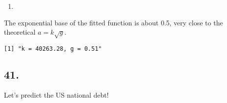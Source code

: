 \documentclass[]{article}
\newenvironment{Shaded}{\begin{snugshade}}{\end{snugshade}}
\newcommand{\DecValTok}[1]{\textcolor[rgb]{0.00,0.00,0.81}{#1}}
\newcommand{\FloatTok}[1]{\textcolor[rgb]{0.00,0.00,0.81}{#1}}
\newcommand{\KeywordTok}[1]{\textcolor[rgb]{0.13,0.29,0.53}{\textbf{#1}}}
\newcommand{\NormalTok}[1]{#1}
\newcommand{\OperatorTok}[1]{\textcolor[rgb]{0.81,0.36,0.00}{\textbf{#1}}}
\newcommand{\StringTok}[1]{\textcolor[rgb]{0.31,0.60,0.02}{#1}}
\begin{document}
\begin{Shaded}
\end{Shaded}

\begin{enumerate}
\def\labelenumi{\alph{enumi}.}
\setcounter{enumi}{2}
\item
\end{enumerate}

The exponential base of the fitted function is about 0.5, very close to
the theoretical \(a = k \sqrt g\).

\begin{Shaded}
\end{Shaded}

\begin{verbatim}
[1] "k = 40263.28, g = 0.51"
\end{verbatim}

\hypertarget{section-20}{%
\subsection{41.}\label{section-20}}

Let's predict the US national debt!
\end{document}
